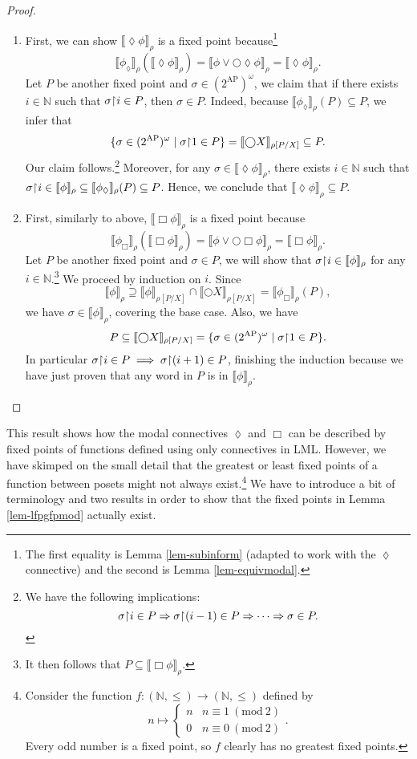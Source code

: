 \documentclass{tufte-handout} %
\theoremstyle{definition}
\theoremstyle{remark}
\newcommand{\Mod}[1]{\ (\text{mod}\ #1)}
\newcommand{\N}{\mathbb{N}}
\newcommand{\0}{\textsf{0}}
\newcommand{\1}{\textsf{1}}
\newcommand{\AP}{\text{AP}}
\newcommand{\rest}[2]{#1 \kern-0.65ex\upharpoonright \kern-0.55ex #2}
\newcommand{\sem}[2]{\llbracket #1 \rrbracket_{#2}}
\begin{document}
\begin{proof}
	\begin{enumerate}
		\item First, we can show $\sem{\lozenge \phi}{\rho}$ is a fixed point because\footnote{The first equality is Lemma \ref{lem-subinform} (adapted to work with the $\lozenge$ connective) and the second is Lemma \ref{lem-equivmodal}.}
		 \[\sem{\phi_{\lozenge}}{\rho}(\sem{\lozenge \phi}{\rho}) = \sem{\phi \vee \bigcirc \lozenge \phi}{\rho} = \sem{\lozenge \phi}{\rho}.\]
		Let $P$ be another fixed point and $\sigma \in (2^{\AP})^{\omega}$, we claim that if there exists $i \in \N$ such that $\rest{\sigma}{i} \in P$, then $\sigma \in P$. Indeed, because $\sem{\phi_{\lozenge}}{\rho}(P) \subseteq P$, we infer that \[\{ \sigma \in (2^{\AP})^{\omega} \mid \rest{\sigma}{1} \in P\} = \sem{\bigcirc X}{\rho[P/X]} \subseteq P.\]
		Our claim follows.\footnote{We have the following implications:
		\[\rest{\sigma}{i} \in P \Rightarrow \rest{\sigma}{(i-1)} \in P \Rightarrow \cdots \Rightarrow \sigma \in P.\]} Moreover, for any $\sigma \in \sem{\lozenge \phi}{\rho}$, there exists $i \in \N$ such that $\rest{\sigma}{i} \in \sem{\phi}{\rho} \subseteq \sem{\phi_{\lozenge}}{\rho}(P) \subseteq P$. Hence, we conclude that $\sem{\lozenge \phi}{\rho} \subseteq P$.
	
		\item First, similarly to above, $\sem{\Box \phi}{\rho}$ is a fixed point because
		\[\sem{\phi_{\Box}}{\rho}(\sem{\Box \phi}{\rho}) = \sem{\phi \vee \bigcirc \Box \phi}{\rho} = \sem{\Box \phi}{\rho}.\]
		Let $P$ be another fixed point and $\sigma \in P$, we will show that $\rest{\sigma}{i} \in \sem{\phi}{\rho}$ for any $i \in \N$.\footnote{It then follows that $P \subseteq \sem{\Box \phi}{\rho}$.} We proceed by induction on $i$. Since \[\sem{\phi}{\rho} \supseteq \sem{\phi}{\rho[P/X]} \cap \sem{\bigcirc X}{\rho[P/X]} = \sem{\phi_{\Box}}{\rho}(P),\] we have $\sigma \in \sem{\phi}{\rho}$, covering the base case. Also, we have 
		\[P \subseteq \sem{\bigcirc X}{\rho[P/X]} = \{ \sigma \in (2^{\AP})^{\omega} \mid \rest{\sigma}{1} \in P\}.\]
		In particular $\rest{\sigma}{i} \in P \implies \rest{\sigma}{(i+1)} \in P$, finishing the induction because we have just proven that any word in $P$ is in $\sem{\phi}{\rho}$.
	\end{enumerate}
\end{proof}

This result shows how the modal connectives $\lozenge$ and $\Box$ can be described by fixed points of functions defined using only connectives in LML. However, we have skimped on the small detail that the greatest or least fixed points of a function between posets might not always exist.\footnote{Consider the function $f: (\N, \leq) \rightarrow (\N, \leq)$ defined by 
\[n \mapsto \begin{cases}n&n \equiv 1 \Mod{2}\\ 0& n \equiv 0 \Mod{2}\end{cases}.\]
Every odd number is a fixed point, so $f$ clearly has no greatest fixed points.} We have to introduce a bit of terminology and two results in order to show that the fixed points in Lemma \ref{lem-lfpgfpmod} actually exist.  
\end{document}
